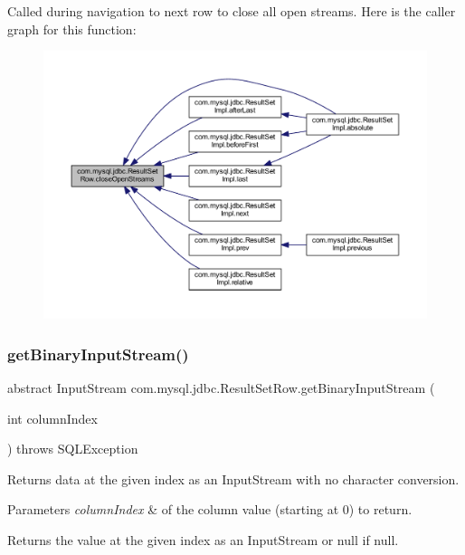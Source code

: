 Called during navigation to next row to close all open streams. Here is the caller graph for this function\+:
\nopagebreak
\begin{figure}[H]
\begin{center}
\leavevmode
\includegraphics[width=350pt]{classcom_1_1mysql_1_1jdbc_1_1_result_set_row_a54a6cea0cae63390d866d6ba7577912c_icgraph}
\end{center}
\end{figure}
\mbox{\label{classcom_1_1mysql_1_1jdbc_1_1_result_set_row_a48ff052b76ef93e6dbd945e75639e995}} 
\subsubsection{\texorpdfstring{get\+Binary\+Input\+Stream()}{getBinaryInputStream()}}
{\footnotesize\ttfamily abstract Input\+Stream com.\+mysql.\+jdbc.\+Result\+Set\+Row.\+get\+Binary\+Input\+Stream (\begin{DoxyParamCaption}\item[{int}]{column\+Index }\end{DoxyParamCaption}) throws S\+Q\+L\+Exception\hspace{0.3cm}{\ttfamily [abstract]}}

Returns data at the given index as an Input\+Stream with no character conversion.


\begin{DoxyParams}{Parameters}
{\em column\+Index} & of the column value (starting at 0) to return. \\
\hline
\end{DoxyParams}
\begin{DoxyReturn}{Returns}
the value at the given index as an Input\+Stream or null if null.
\end{DoxyReturn}

